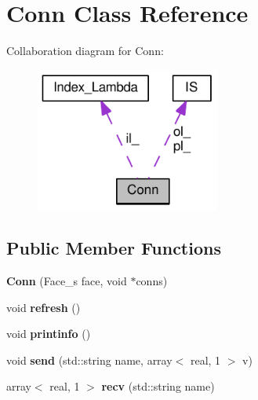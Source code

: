 \hypertarget{classConn}{
\section{Conn Class Reference}
\label{classConn}
}
Collaboration diagram for Conn:\nopagebreak
\begin{figure}[H]
\begin{center}
\leavevmode
\includegraphics[width=172pt]{classConn__coll__graph}
\end{center}
\end{figure}
\subsection*{Public Member Functions}
\begin{DoxyCompactItemize}
\item 
\hypertarget{classConn_ab0ba4fbd67bc99991f2110c3ca80ca3d}{
{\bfseries Conn} (Face\_\-s face, void $\ast$conns)}
\label{classConn_ab0ba4fbd67bc99991f2110c3ca80ca3d}

\item 
\hypertarget{classConn_af3776731e374e856bb5eac3faea03ae3}{
void {\bfseries refresh} ()}
\label{classConn_af3776731e374e856bb5eac3faea03ae3}

\item 
\hypertarget{classConn_add96cc92a7575634f44220cb6e2e2421}{
void {\bfseries printinfo} ()}
\label{classConn_add96cc92a7575634f44220cb6e2e2421}

\item 
\hypertarget{classConn_ace36b6085ceadcfa9654b5950e7719c0}{
void {\bfseries send} (std::string name, array$<$ real, 1 $>$ v)}
\label{classConn_ace36b6085ceadcfa9654b5950e7719c0}

\item 
\hypertarget{classConn_a5f149a3217d7cf6227b48571638cadf8}{
array$<$ real, 1 $>$ {\bfseries recv} (std::string name)}
\label{classConn_a5f149a3217d7cf6227b48571638cadf8}

\end{DoxyCompactItemize}
